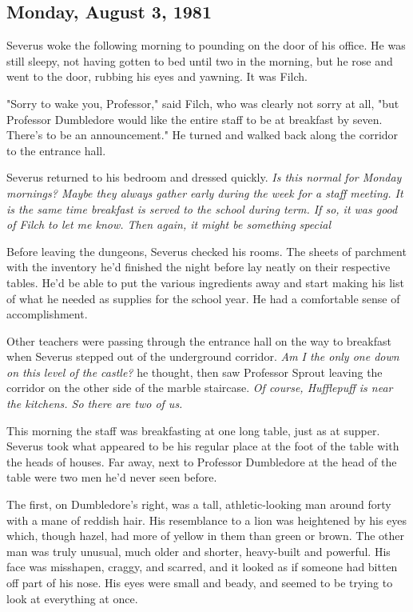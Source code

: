 \subsection{Monday, August 3, 1981}

Severus woke the following morning to pounding on the door of his office. He was still sleepy, not having gotten to bed until two in the morning, but he rose and went to the door, rubbing his eyes and yawning. It was Filch.

"Sorry to wake you, Professor," said Filch, who was clearly not sorry at all, "but Professor Dumbledore would like the entire staff to be at breakfast by seven. There's to be an announcement." He turned and walked back along the corridor to the entrance hall.

Severus returned to his bedroom and dressed quickly. \emph{Is this normal for Monday mornings? Maybe they always gather early during the week for a staff meeting. It is the same time breakfast is served to the school during term. If so, it was good of Filch to let me know. Then again, it might be something special{\el}}

Before leaving the dungeons, Severus checked his rooms. The sheets of parchment with the inventory he'd finished the night before lay neatly on their respective tables. He'd be able to put the various ingredients away and start making his list of what he needed as supplies for the school year. He had a comfortable sense of accomplishment.

Other teachers were passing through the entrance hall on the way to breakfast when Severus stepped out of the underground corridor. \emph{Am I the only one down on this level of the castle?} he thought, then saw Professor Sprout leaving the corridor on the other side of the marble staircase. \emph{Of course, Hufflepuff is near the kitchens. So there are two of us.}

This morning the staff was breakfasting at one long table, just as at supper. Severus took what appeared to be his regular place at the foot of the table with the heads of houses. Far away, next to Professor Dumbledore at the head of the table were two men he'd never seen before.

The first, on Dumbledore's right, was a tall, athletic-looking man around forty with a mane of reddish hair. His resemblance to a lion was heightened by his eyes which, though hazel, had more of yellow in them than green or brown. The other man was truly unusual, much older and shorter, heavy-built and powerful. His face was misshapen, craggy, and scarred, and it looked as if someone had bitten off part of his nose. His eyes were small and beady, and seemed to be trying to look at everything at once.

